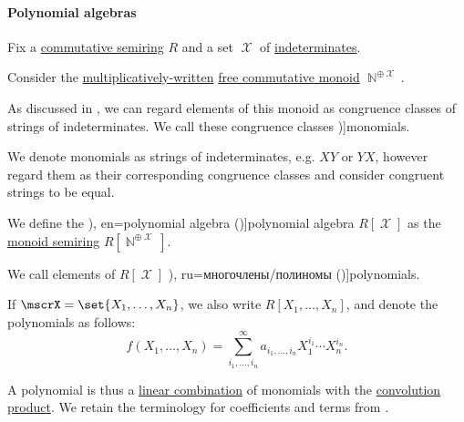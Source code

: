 \paragraph{Polynomial algebras}

\begin{definition}\label{def:polynomial_algebra}\mimprovised
  Fix a \hyperref[def:semiring/commutative]{commutative semiring} \( R \) and a set \( \mscrX \) of \hyperref[con:indeterminate]{indeterminates}.

  \begin{thmenum}
     Consider the \hyperref[def:free_commutative_monoid]{multiplicatively-written} \hyperref[def:free_commutative_monoid]{free commutative monoid} \( \BbbN^{\oplus \mscrX} \).

    As discussed in , we can regard elements of this monoid as congruence classes of strings of indeterminates. We call these congruence classes \term[ru=одночлен/моном (\cite[sec. 11.3]{Тыртышников2007ЛинейнаяАлгебра})]{monomials}.

    We denote monomials as strings of indeterminates, e.g. \( XY \) or \( YX \), however regard them as their corresponding congruence classes and consider congruent strings to be equal.

     We define the \term[ru=алгебра многочленов (\cite[92]{Винберг2014КурсАлгебры}), en=polynomial algebra (\cite[473]{Bourbaki1998Algebra1to3})]{polynomial algebra} \( R[\mscrX] \) as the \hyperref[def:semigroup_algebra]{monoid semiring} \( R[\BbbN^{\oplus \mscrX}] \).

    We call elements of \( R[\mscrX] \) \term[bg=полиноми (\cite[1]{Обрешков1962ВисшаАлгебра}), ru=многочлены/полиномы (\cite[54]{Фаддеев1984ЛекцииПоАлгебре})]{polynomials}.

    If \( \mscrX = \set{ X_1, \ldots, X_n } \), we also write \( R[X_1, \ldots, X_n] \), and denote the polynomials as follows:
    \begin{equation}\label{eq:def:polynomial_algebra/polynomials}
      f(X_1, \ldots, X_n) = \sum_{i_1,\ldots,i_n}^\infty a_{i_1,\ldots,i_n} X_1^{i_1} \cdots X_n^{i_n}.
    \end{equation}

    A polynomial is thus a \hyperref[def:linear_combination]{linear combination} of monomials with the \hyperref[def:semigroup_algebra]{convolution product}. We retain the terminology for coefficients and terms from .


\end{thmenum}
\end{definition}
